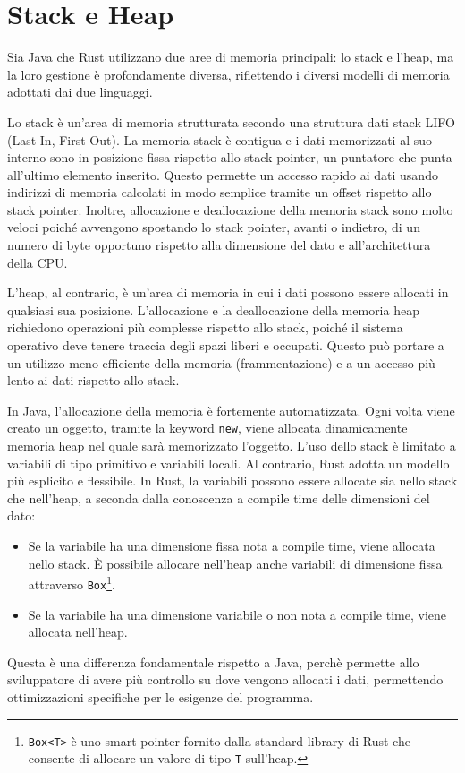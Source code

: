 \section{Stack e Heap}
Sia Java che Rust utilizzano due aree di memoria principali: lo stack e l'heap, ma la loro gestione è profondamente diversa, riflettendo i diversi modelli di memoria adottati dai due linguaggi.

Lo stack è un'area di memoria strutturata secondo una struttura dati stack LIFO (Last In, First Out). La memoria stack è contigua e i dati memorizzati al suo interno sono in posizione fissa rispetto allo stack pointer, un puntatore che punta all'ultimo elemento inserito. Questo permette un accesso rapido ai dati usando indirizzi di memoria calcolati in modo semplice tramite un offset rispetto allo stack pointer. Inoltre, allocazione e deallocazione della memoria stack sono molto veloci poiché avvengono spostando lo stack pointer, avanti o indietro, di un numero di byte opportuno rispetto alla dimensione del dato e all'architettura della CPU.

L'heap, al contrario, è un'area di memoria in cui i dati possono essere allocati in qualsiasi sua posizione. L'allocazione e la deallocazione della memoria heap richiedono operazioni più complesse rispetto allo stack, poiché il sistema operativo deve tenere traccia degli spazi liberi e occupati. Questo può portare a un utilizzo meno efficiente della memoria (frammentazione) e a un accesso più lento ai dati rispetto allo stack. 

In Java, l'allocazione della memoria è fortemente automatizzata. Ogni volta viene creato un oggetto, tramite la keyword \texttt{new}, viene allocata dinamicamente memoria heap nel quale sarà memorizzato l'oggetto. L'uso dello stack è limitato a variabili di tipo primitivo e variabili locali. Al contrario, Rust adotta un modello più esplicito e flessibile. In Rust, la variabili possono essere allocate sia nello stack che nell'heap, a seconda dalla conoscenza a compile time delle dimensioni del dato:
\begin{itemize}
    \item  Se la variabile ha una dimensione fissa nota a compile time, viene allocata nello stack. È possibile allocare nell'heap anche variabili di dimensione fissa attraverso \texttt{Box}\footnote{\texttt{Box<T>} è uno smart pointer fornito dalla standard library di Rust che consente di allocare un valore di tipo \texttt{T} sull'heap.}.
    \item  Se la variabile ha una dimensione variabile o non nota a compile time, viene allocata nell'heap. 
\end{itemize} 
Questa è una differenza fondamentale rispetto a Java, perchè permette allo sviluppatore di avere più controllo su dove vengono allocati i dati, permettendo ottimizzazioni specifiche per le esigenze del programma. 

